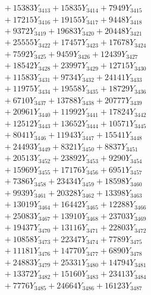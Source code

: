 \documentclass[a4paper,10pt]{article}
\begin{document}
{\begin{align}
&\;  + 15383 Y_{3413} + 15835 Y_{3414} + 7949 Y_{3415} \\[0.3ex]
&\;  + 17215 Y_{3416} + 19155 Y_{3417} + 9448 Y_{3418} \\[0.5ex]\allowbreak
&\;  + 9372 Y_{3419} + 19683 Y_{3420} + 20448 Y_{3421} \\[0.3ex]
&\;  + 25555 Y_{3422} + 17457 Y_{3423} + 17678 Y_{3424} \\[0.3ex]
&\;  + 7592 Y_{3425} + 9459 Y_{3426} + 12439 Y_{3427} \\[0.3ex]
&\;  + 18542 Y_{3428} + 23997 Y_{3429} + 12715 Y_{3430} \\[0.3ex]
&\;  + 11583 Y_{3431} + 9734 Y_{3432} + 24141 Y_{3433} \\[0.3ex]
&\;  + 11975 Y_{3434} + 19558 Y_{3435} + 18729 Y_{3436} \\[0.3ex]
&\;  + 6710 Y_{3437} + 13788 Y_{3438} + 20777 Y_{3439} \\[0.3ex]
&\;  + 20961 Y_{3440} + 11992 Y_{3441} + 17824 Y_{3442} \\[0.3ex]
&\;  + 12512 Y_{3443} + 13652 Y_{3444} + 10571 Y_{3445} \\[0.3ex]
&\;  + 8041 Y_{3446} + 11943 Y_{3447} + 15541 Y_{3448} \\[0.5ex]\allowbreak
&\;  + 24493 Y_{3449} + 8321 Y_{3450} + 8837 Y_{3451} \\[0.3ex]
&\;  + 20513 Y_{3452} + 23892 Y_{3453} + 9290 Y_{3454} \\[0.3ex]
&\;  + 15969 Y_{3455} + 17176 Y_{3456} + 6951 Y_{3457} \\[0.3ex]
&\;  + 7386 Y_{3458} + 23434 Y_{3459} + 18598 Y_{3460} \\[0.3ex]
&\;  + 9939 Y_{3461} + 20328 Y_{3462} + 13398 Y_{3463} \\[0.3ex]
&\;  + 13019 Y_{3464} + 16442 Y_{3465} + 12288 Y_{3466} \\[0.3ex]
&\;  + 25083 Y_{3467} + 13910 Y_{3468} + 23703 Y_{3469} \\[0.3ex]
&\;  + 19437 Y_{3470} + 13116 Y_{3471} + 22803 Y_{3472} \\[0.3ex]
&\;  + 10858 Y_{3473} + 22347 Y_{3474} + 7789 Y_{3475} \\[0.3ex]
&\;  + 11181 Y_{3476} + 14770 Y_{3477} + 6890 Y_{3478} \\[0.5ex]\allowbreak
&\;  + 24883 Y_{3479} + 25331 Y_{3480} + 14794 Y_{3481} \\[0.3ex]
&\;  + 13372 Y_{3482} + 15160 Y_{3483} + 23413 Y_{3484} \\[0.3ex]
&\;  + 7776 Y_{3485} + 24664 Y_{3486} + 16123 Y_{3487} \\[0.3ex]

\end{align}}
\end{document}
